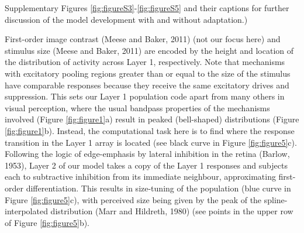 \documentclass[
]{article}
\begin{document}
Supplementary Figures \ref{fig:figureS3}-\ref{fig:figureS5} and their captions for further discussion of the model development with and without adaptation.)

First-order image contrast (Meese and Baker, 2011) (not our focus here) and stimulus size (Meese and Baker, 2011) are encoded by the height and location of the distribution of activity across Layer 1, respectively. Note that mechanisms with excitatory pooling regions greater than or equal to the size of the stimulus have comparable responses because they receive the same excitatory drives and suppression. This sets our Layer 1 population code apart from many others in visual perception, where the usual bandpass properties of the mechanisms involved (Figure \ref{fig:figure1}a) result in peaked (bell-shaped) distributions (Figure \ref{fig:figure1}b). Instead, the computational task here is to find where the response transition in the Layer 1 array is located (see black curve in Figure \ref{fig:figure5}c). Following the logic of edge-emphasis by lateral inhibition in the retina (Barlow, 1953), Layer 2 of our model takes a copy of the Layer 1 responses and subjects each to subtractive inhibition from its immediate neighbour, approximating first-order differentiation. This results in size-tuning of the population (blue curve in Figure \ref{fig:figure5}c), with perceived size being given by the peak of the spline-interpolated distribution (Marr and Hildreth, 1980) (see points in the upper row of Figure \ref{fig:figure5}b).
\end{document}
